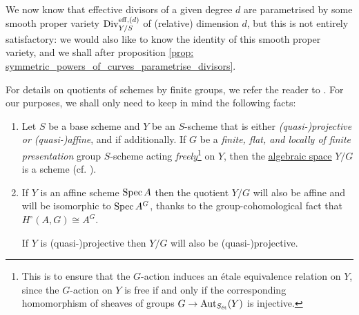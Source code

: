        We now know that effective divisors of a given degree $d$ are parametrised by some smooth proper variety $\mathrm{Div}_{Y/S}^{\mathrm{eff}, (d)}$ of (relative) dimension $d$, but this is not entirely satisfactory: we would also like to know the identity of this smooth proper variety, and we shall after proposition \ref{prop: symmetric_powers_of_curves_parametrise_divisors}.
        \begin{remark} \label{remark: quotients_of_schemes_by_finite_group_schemes}
            For details on quotients of schemes by finite groups, we refer the reader to \cite[Expos\'e V]{SGA1}. For our purposes, we shall only need to keep in mind the following facts: 
                \begin{enumerate}
                    \item Let $S$ be a base scheme and $Y$ be an $S$-scheme that is either \textit{(quasi-)projective or (quasi-)affine}, and if additionally. If $G$ be a \textit{finite, flat, and locally of finite presentation} group $S$-scheme acting \textit{freely}\footnote{This is to ensure that the $G$-action induces an \'etale equivalence relation on $Y$, since the $G$-action on $Y$ is free if and only if the corresponding homomorphism of sheaves of groups $G \to \mathrm{Aut}_{S_{\mathrm{\acute{e}t}}}(Y)$ is injective.} on $Y$, then the \href{https://stacks.math.columbia.edu/tag/025X}{\underline{algebraic space}} $Y/G$ is a scheme (cf. \cite[\href{https://stacks.math.columbia.edu/tag/07S7}{Tag 07S7}]{stacks}). 
                    \item If $Y$ is an affine scheme $\operatorname{Spec} A$ then the quotient $Y/G$ will also be affine and will be isomorphic to $\operatorname{Spec} A^G$, thanks to the group-cohomological fact that $H^{\circ}(A, G) \cong A^G$. 
                    
                    If $Y$ is (quasi-)projective then $Y/G$ will also be (quasi-)projective.
                \end{enumerate}
        \end{remark}
        
